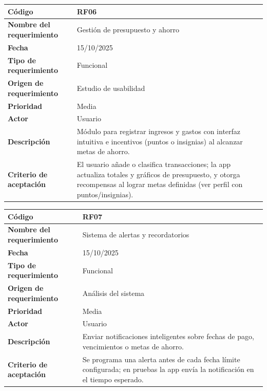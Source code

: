 \begin{table}[H]
	\begin{tabular}{|a{5cm}|m{11cm}|}
		\hline
		\textbf{Código} & RF06 \\ \hline
		\textbf{Nombre del requerimiento} & Gestión de presupuesto y ahorro \\ \hline
		\textbf{Fecha} & 15/10/2025 \\ \hline
		\textbf{Tipo de requerimiento} & Funcional \\ \hline
		\textbf{Origen de requerimiento} & Estudio de usabilidad \\ \hline
		\textbf{Prioridad} & Media \\ \hline
		\textbf{Actor} & Usuario \\ \hline
		\textbf{Descripción} & Módulo para registrar ingresos y gastos con interfaz intuitiva e incentivos (puntos o insignias) al alcanzar metas de ahorro. \\ \hline
		\textbf{Criterio de aceptación} & El usuario añade o clasifica transacciones; la app actualiza totales y gráficos de presupuesto, y otorga recompensas al lograr metas definidas (ver perfil con puntos/insignias). \\ \hline
	\end{tabular}
\end{table}

\begin{table}[H]
	\begin{tabular}{|a{5cm}|m{11cm}|}
		\hline
		\textbf{Código} & RF07 \\ \hline
		\textbf{Nombre del requerimiento} & Sistema de alertas y recordatorios \\ \hline
		\textbf{Fecha} & 15/10/2025 \\ \hline
		\textbf{Tipo de requerimiento} & Funcional \\ \hline
		\textbf{Origen de requerimiento} & Análisis del sistema \\ \hline
		\textbf{Prioridad} & Media \\ \hline
		\textbf{Actor} & Usuario \\ \hline
		\textbf{Descripción} & Enviar notificaciones inteligentes sobre fechas de pago, vencimientos o metas de ahorro. \\ \hline
		\textbf{Criterio de aceptación} & Se programa una alerta antes de cada fecha límite configurada; en pruebas la app envía la notificación en el tiempo esperado. \\ \hline
	\end{tabular}
\end{table}

